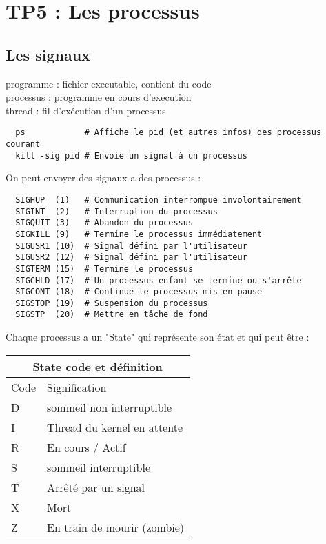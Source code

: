 \documentclass{article}
\begin{document}
\section{TP5 : Les processus}

\subsection{Les signaux}

  programme : fichier executable, contient du code \\
  processus : programme en cours d'execution \\
  thread    : fil d'exécution d'un processus \\

\begin{verbatim}
  ps            # Affiche le pid (et autres infos) des processus courant
  kill -sig pid # Envoie un signal à un processus
\end{verbatim}

On peut envoyer des signaux a des processus :

\begin{verbatim}
  SIGHUP  (1)   # Communication interrompue involontairement
  SIGINT  (2)   # Interruption du processus
  SIGQUIT (3)   # Abandon du processus
  SIGKILL (9)   # Termine le processus immédiatement
  SIGUSR1 (10)  # Signal défini par l'utilisateur
  SIGUSR2 (12)  # Signal défini par l'utilisateur
  SIGTERM (15)  # Termine le processus 
  SIGCHLD (17)  # Un processus enfant se termine ou s'arrête
  SIGCONT (18)  # Continue le processus mis en pause
  SIGSTOP (19)  # Suspension du processus
  SIGSTP  (20)  # Mettre en tâche de fond
\end{verbatim}

Chaque processus a un "State" qui représente son état et qui peut être :

\medskip

\begin{tabular}{ |p{4cm}||p{4cm}| }
 \hline
  \multicolumn{2}{|c|}{State code et définition} \\
 \hline
  Code & Signification \\
 \hline
  D & sommeil non interruptible \\
 \hline
  I & Thread du kernel en attente \\
 \hline
  R & En cours / Actif \\
 \hline
  S & sommeil interruptible \\
  \hline 
  T & Arrêté par un signal \\
  \hline 
  X & Mort \\
  \hline
  Z & En train de mourir (zombie) \\
  \hline
\end{tabular}
\end{document}
